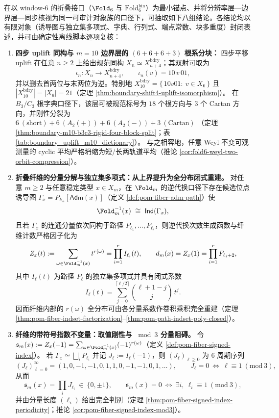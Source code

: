 \begin{theorem}\label{thm:window6-unified-skeleton}
在以 window-\(6\) 的折叠接口（\(\Fold_6\) 与 \(\mathrm{Fold}^{\mathrm{bin}}_6\)）为最小锚点、并将分辨率层—边界层—同步核视为同一可审计对象族的口径下，可抽取如下八组结论。各结论均以有限对象（诱导图与独立集多项式、字典、行列式、端点常数、块多重度）封闭表述，并可由确定性离线脚本逐项复核：
\begin{enumerate}
  \item \textbf{四步 uplift 同构与 \(m=10\) 边界层的 \texorpdfstring{$(6+6+6+3)$}{(6+6+6+3)} 根系分块：}
  四步平移 uplift 在任意 \(n\ge 2\) 上给出规范同构 \(X_n\simeq X_{n+4}^{\mathrm{bdry}}\)；其双射可取为
  \[
  \iota_n:X_n\to X_{n+4}^{\mathrm{bdry}},
  \qquad
  \iota_n(v)=10\,v\,01,
  \]
  并以删去首两位与末两位为逆。特别地
  \(
  X_{10}^{\mathrm{bdry}}=\{\,10v01:\ v\in X_6\,\}
  \)
  且 \(|X_{10}^{\mathrm{bdry}}|=|X_6|=21\)（定理 \ref{thm:boundary-shift4-uplift-isomorphism}）。
  在 \(B_3/C_3\) 根字典口径下，该层可被规范标号为 \(18\) 个根方向与 \(3\) 个 Cartan 方向，并刚性分裂为
  \(
  6\ (\mathrm{short})+6\ (A_2(+))+6\ (A_2(-))+3\ (\mathrm{Cartan})
  \)
  （定理 \ref{thm:boundary-m10-b3c3-rigid-four-block-split}；表 \ref{tab:boundary_uplift_m10_dictionary}）。
  与之相容地，任意 Weyl-不变可观测量的 cyclic 平均严格坍缩为短/长两轨道平均（推论 \ref{cor:fold6-weyl-two-orbit-compression}）。

  \item \textbf{折叠纤维的分量分解与独立集多项式：从上界提升为全分布闭式重建。}
  对任意 \(m\ge 2\) 与任意稳定类型 \(x\in X_m\)，在 \(\Fold_m\) 的逆代换口径下存在候选位点诱导图 \(\Gamma_x=P_{k_+}[\mathsf{Adm}(x)]\)（定义 \ref{def:pom-fiber-adm-path}）使
  \[
  \Fold_m^{-1}(x)\ \cong\ \mathsf{Ind}(\Gamma_x),
  \]
  且若 \(\Gamma_x\) 的连通分量依次同构于路径 \(P_{\ell_1},\dots,P_{\ell_r}\)，则逆代换次数生成函数与纤维计数严格因子化为
  \[
  Z_x(t):=\sum_{\omega\in\Fold_m^{-1}(x)}t^{r(\omega)}
  =\prod_{i=1}^r I_{\ell_i}(t),
  \qquad
  d_m(x)=Z_x(1)=\prod_{i=1}^r F_{\ell_i+2},
  \]
  其中 \(I_{\ell}(t)\) 为路径 \(P_\ell\) 的独立集多项式并具有闭式系数
  \[
  I_{\ell}(t)=\sum_{j=0}^{\lceil \ell/2\rceil}\binom{\ell+1-j}{j}\,t^j.
  \]
  因而纤维内部的 \(r(\omega)\) 全分布可由各分量系数作卷积乘积完全重建（定理 \ref{thm:pom-fiber-indset-factorization}--\ref{thm:pom-path-indset-poly-closed}）。

  \item \textbf{纤维的带符号指数不变量：取值刚性与 \texorpdfstring{$\bmod 3$}{mod 3} 分量阻碍。}
  令 \(\mathfrak{s}_m(x):=Z_x(-1)=\sum_{\omega\in\Fold_m^{-1}(x)}(-1)^{r(\omega)}\)（定义 \ref{def:pom-fiber-signed-index}）。
  若 \(\Gamma_x\simeq\bigsqcup_i P_{\ell_i}\) 并记 \(J_\ell:=I_\ell(-1)\)，则 \((J_\ell)_{\ell\ge 0}\) 为 \(6\) 周期序列
  \[
  (J_\ell)_{\ell=0}^{\infty}=(1,0,-1,-1,0,1,1,0,-1,-1,0,1,\dots),
  \qquad
  J_\ell=0\ \Longleftrightarrow\ \ell\equiv 1\ (\mathrm{mod}\ 3),
  \]
  从而
  \[
  \mathfrak{s}_m(x)=\prod_i J_{\ell_i}\ \in\ \{0,\pm 1\},
  \qquad
  \mathfrak{s}_m(x)=0\ \Longleftrightarrow\ \exists i,\ \ell_i\equiv 1\ (\mathrm{mod}\ 3),
  \]
  并由分量长度 \((\ell_i)\) 给出完全判别（定理 \ref{thm:pom-fiber-signed-index-periodicity}；推论 \ref{cor:pom-fiber-signed-index-mod3}）。


\end{enumerate}
\end{theorem}
